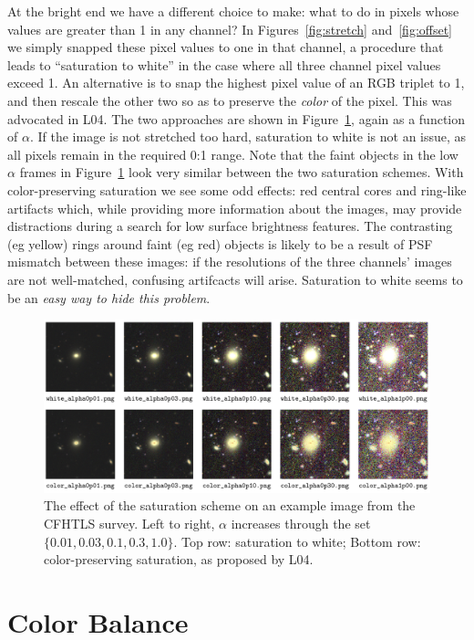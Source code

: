 \documentclass[letterpaper, 11pt]{article}
\begin{document}
At the bright end we have a different choice to make: what to do in pixels
whose values are greater than 1 in any channel? In Figures~\ref{fig:stretch}
and~\ref{fig:offset} we simply snapped these pixel values to one in that
channel, a procedure that leads to ``saturation to white'' in the case where
all three channel pixel values exceed 1. An alternative is to snap the highest
pixel value of an RGB triplet to 1, and then rescale the other two so as to
preserve the {\it color} of the pixel. This was advocated in L04. The two
approaches are shown in Figure~\ref{fig:saturation}, again as a function of
$\alpha$. If the image is not stretched too hard, saturation to white is not
an issue, as all pixels remain in the required 0:1 range. Note that the faint
objects in the low $\alpha$ frames in Figure~\ref{fig:saturation} look very
similar between the two saturation schemes. With
color-preserving saturation we see some odd effects: red central cores and
ring-like artifacts which, while providing more information about the images,
may provide distractions during a search for low surface brightness features. 
The contrasting (eg yellow) rings around faint (eg red) objects is likely to
be a result of PSF mismatch between these images: if the resolutions of the
three channels' images are not well-matched, confusing artifcacts will arise.
Saturation to white seems to be an {\it easy way to hide this problem}.

\begin{figure}
\centering\includegraphics[width=0.9\linewidth]{Images/CFHTLS_27_saturation_gallery.png}
\caption{The effect of the saturation scheme on an
example image from the CFHTLS survey. Left to right, $\alpha$ increases
through the set $\{0.01,0.03,0.1,0.3,1.0\}$. Top row: saturation to white;
Bottom row: color-preserving saturation, as proposed by L04.}
\label{fig:saturation}
\end{figure}


\section{Color Balance}
\label{sec:color}
\end{document}
